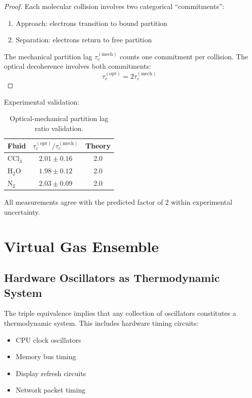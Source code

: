 \documentclass[aps,prl,twocolumn,superscriptaddress,floatfix]{revtex4-2}
\begin{document}
\begin{proof}
Each molecular collision involves two categorical ``commitments'':
\begin{enumerate}
\item Approach: electrons transition to bound partition
\item Separation: electrons return to free partition
\end{enumerate}

The mechanical partition lag $\tau_c^{(\text{mech})}$ counts one commitment per collision. The optical decoherence involves both commitments:
\begin{equation}
\tau_c^{(\text{opt})} = 2 \tau_c^{(\text{mech})}
\end{equation}
\end{proof}

Experimental validation:
\begin{table}[h]
\centering
\begin{tabular}{lcc}
\toprule
Fluid & $\tau_c^{(\text{opt})}/\tau_c^{(\text{mech})}$ & Theory \\
\midrule
CCl$_4$ & $2.01 \pm 0.16$ & 2.0 \\
H$_2$O & $1.98 \pm 0.12$ & 2.0 \\
N$_2$ & $2.03 \pm 0.09$ & 2.0 \\
\bottomrule
\end{tabular}
\caption{Optical-mechanical partition lag ratio validation.}
\end{table}

All measurements agree with the predicted factor of 2 within experimental uncertainty.

\section{Virtual Gas Ensemble}

\subsection{Hardware Oscillators as Thermodynamic System}

The triple equivalence implies that any collection of oscillators constitutes a thermodynamic system. This includes hardware timing circuits:
\begin{itemize}
\item CPU clock oscillators
\item Memory bus timing
\item Display refresh circuits
\item Network packet timing
\end{itemize}
\end{document}
